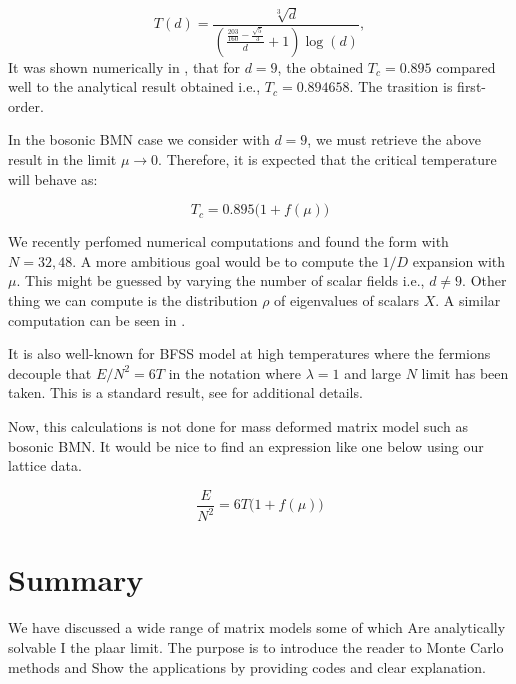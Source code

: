 \documentclass[11pt]{article}
\begin{document}
\begin{equation}
T(d) = \frac{\sqrt[3]{d}}{\left(\frac{\frac{203}{160}-\frac{\sqrt{5}}{3}}{d}+1\right) \log (d)}, 
\end{equation}
It was shown numerically in \cite{Bergner:2019rca}, that for $d = 9$, the obtained $T_{c} = 0.895$ compared well to the analytical result obtained i.e., $T_{c} = 0.894658$. The trasition is first-order. 

In the bosonic BMN case we consider with $d=9$, we must retrieve the above result in the limit $ \mu \to 0$. Therefore, it is expected that the critical temperature will behave as:

\begin{equation}
T_{c} = 0.895 \Big( 1 + f(\mu) \Big)
\end{equation}

We recently perfomed numerical computations and found the form with $N=32,48$. A more ambitious goal would be to compute the $1/D$ expansion with $\mu$. This might be guessed by varying the number of scalar fields i.e., $d \neq 9$. Other thing we can compute is the distribution $\rho$ of eigenvalues of scalars $X$. 
A similar computation can be seen in \cite{Filev:2015hia}. 
 


It is also well-known for BFSS model at high temperatures where the fermions decouple that $ E/N^2 = 6T$ in the notation where $\lambda=1$ and large $N$ limit has been taken. This is a standard result, see \cite{Kawahara:2007ib} for additional details. 

Now, this calculations is not done for mass deformed matrix model such as bosonic BMN. It would be nice to find an expression like one below using our lattice data.

\begin{equation}
\frac{E}{N^2} = 6T \Bigg( 1 + f(\mu) \Bigg)
\end{equation}



\section{Summary}

We have discussed a wide range of matrix models some of which
Are analytically solvable I the plaar limit. 
The purpose is to introduce the reader to Monte Carlo methods and
Show the applications by providing codes and clear explanation. 
\end{document}
